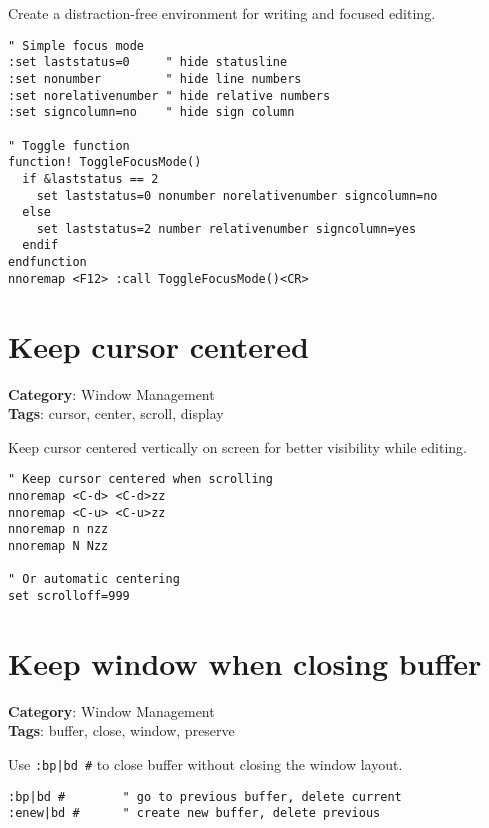 {{{{{{{{{{{{{{{{{{{Create a distraction-free environment for writing and focused editing.

\begin{Exa*}{}
\begin{Verbatim}[fontsize=\footnotesize, breaklines, breakanywhere]
" Simple focus mode
:set laststatus=0     " hide statusline
:set nonumber         " hide line numbers
:set norelativenumber " hide relative numbers
:set signcolumn=no    " hide sign column

" Toggle function
function! ToggleFocusMode()
  if &laststatus == 2
    set laststatus=0 nonumber norelativenumber signcolumn=no
  else
    set laststatus=2 number relativenumber signcolumn=yes
  endif
endfunction
nnoremap <F12> :call ToggleFocusMode()<CR>
\end{Verbatim}
\end{Exa*}

\section{Keep cursor centered}

\textbf{Category}: Window Management\\ \textbf{Tags}: cursor, center, scroll, display
\vspace{0.5cm}

Keep cursor centered vertically on screen for better visibility while editing.

\begin{Exa*}{}
\begin{Verbatim}[fontsize=\footnotesize, breaklines, breakanywhere]
" Keep cursor centered when scrolling
nnoremap <C-d> <C-d>zz
nnoremap <C-u> <C-u>zz
nnoremap n nzz
nnoremap N Nzz

" Or automatic centering
set scrolloff=999
\end{Verbatim}
\end{Exa*}

\section{Keep window when closing buffer}

\textbf{Category}: Window Management\\ \textbf{Tags}: buffer, close, window, preserve
\vspace{0.5cm}

Use {\footnotesize \Verb§:bp|bd #§} to close buffer without closing the window layout.

\begin{Exa*}{}
\begin{Verbatim}[fontsize=\footnotesize, breaklines, breakanywhere]
:bp|bd #        " go to previous buffer, delete current
:enew|bd #      " create new buffer, delete previous
\end{Verbatim}
\end{Exa*}

}}}}}}}}}}}}}}}}}}}
